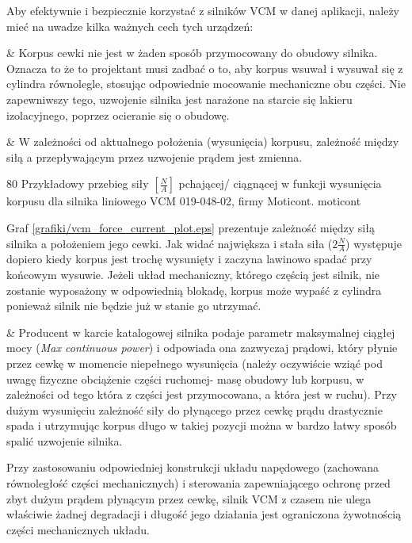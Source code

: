 Aby efektywnie i bezpiecznie korzystać z silników VCM w danej aplikacji, należy mieć na uwadze kilka ważnych cech tych urządzeń:

\begin{easylist}
	& Korpus cewki nie jest w żaden sposób przymocowany do obudowy silnika. Oznacza to że to projektant musi zadbać o to, aby korpus wsuwał i wysuwał się z cylindra równolegle, stosując odpowiednie mocowanie mechaniczne obu części. Nie zapewniwszy tego, uzwojenie silnika jest narażone na starcie się lakieru izolacyjnego, poprzez ocieranie się o obudowę. 
	
	& W zależności od aktualnego położenia (wysunięcia) korpusu, zależność między siłą a przepływającym przez uzwojenie prądem jest zmienna.
	
		{80}
		{Przykładowy przebieg siły $ [\frac{N}{A}] $ pchającej/ ciągnącej w funkcji wysunięcia korpusu dla silnika liniowego VCM 019-048-02, firmy Moticont.}
		{moticont}
	
Graf \ref{grafiki/vcm_force_current_plot.eps} prezentuje zależność między siłą silnika a położeniem jego cewki. Jak widać największa i stała siła ($ 2 \frac{N}{A} $) występuje dopiero kiedy korpus jest trochę wysunięty i zaczyna lawinowo spadać przy końcowym wysuwie. Jeżeli układ mechaniczny, którego częścią jest silnik, nie zostanie wyposażony w odpowiednią blokadę, korpus może wypaść z cylindra ponieważ silnik nie będzie już w stanie go utrzymać.

	& Producent w karcie katalogowej silnika podaje parametr maksymalnej ciągłej mocy ({\em Max continuous power}) i odpowiada ona zazwyczaj prądowi, który płynie przez cewkę w momencie niepełnego wysunięcia (należy oczywiście wziąć pod uwagę fizyczne obciążenie części ruchomej- masę obudowy lub korpusu, w zależności od tego która z części jest przymocowana, a która jest w ruchu). Przy dużym wysunięciu zależność siły do płynącego przez cewkę prądu drastycznie spada i utrzymując korpus długo w takiej pozycji można w bardzo łatwy sposób spalić uzwojenie silnika. \\
	
\end{easylist}

Przy zastosowaniu odpowiedniej konstrukcji układu napędowego (zachowana równoległość części mechanicznych) i sterowania zapewniającego ochronę przed zbyt dużym prądem płynącym przez cewkę, silnik VCM z czasem nie ulega właściwie żadnej degradacji i długość jego działania jest ograniczona żywotnością części mechanicznych układu.









